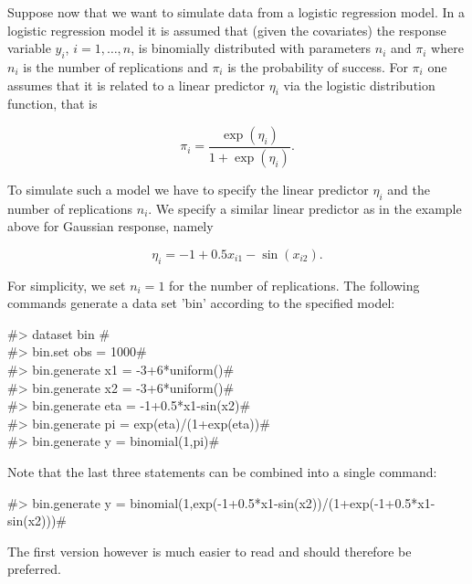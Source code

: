 Suppose now that we want to simulate data from a logistic
regression model. In a logistic regression model it is assumed
that (given the  covariates) the response variable $y_i$,
$i=1,\dots,n$, is binomially distributed with parameters $n_i$ and
$\pi_i$ where $n_i$ is the number of replications and $\pi_i$ is
the probability of success. For $\pi_i$ one assumes that it is
related to a linear predictor $\eta_i$ via the logistic
distribution function, that is

$$
\pi_i = \frac{\exp(\eta_i)}{1+\exp{(\eta_i)}}.
$$

To simulate such a model we have to specify the linear predictor
$\eta_i$ and the number of replications $n_i$. We specify a
similar linear predictor as in the example above for Gaussian
response, namely

$$
\eta_i = -1+0.5x_{i1}-\sin(x_{i2}).
$$


For simplicity, we set $n_i=1$ for the number of replications. The
following commands generate a data set 'bin'
according to the specified model:


#> dataset bin #\\
#> bin.set obs = 1000# \\
#> bin.generate x1 = -3+6*uniform()# \\
#> bin.generate x2 = -3+6*uniform()# \\
#> bin.generate eta = -1+0.5*x1-sin(x2)# \\
#> bin.generate pi = exp(eta)/(1+exp(eta))# \\
#> bin.generate y = binomial(1,pi)#

Note that the last three statements can be combined into a single command:

#> bin.generate y = binomial(1,exp(-1+0.5*x1-sin(x2))/(1+exp(-1+0.5*x1-sin(x2)))#


The first version however is much easier to read and should
therefore be preferred.
